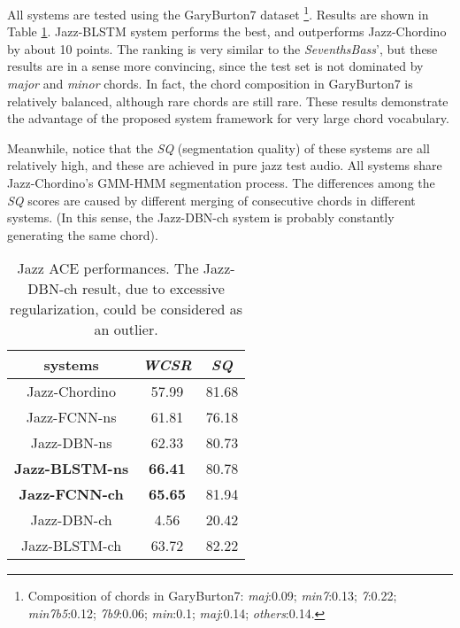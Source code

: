 All systems are tested using the GaryBurton7 dataset \footnote{Composition of chords in GaryBurton7: \textit{maj}:0.09; \textit{min7}:0.13; \textit{7}:0.22; \textit{min7b5}:0.12; \textit{7b9}:0.06; \textit{min}:0.1; \textit{maj}:0.14; \textit{others}:0.14.}. Results are shown in Table \ref{tab:5-jazz-wcsr}. Jazz-BLSTM system performs the best, and outperforms Jazz-Chordino by about 10 points. The ranking is very similar to the \textit{SeventhsBass}', but these results are in a sense more convincing, since the test set is not dominated by \textit{major} and \textit{minor} chords. In fact, the chord composition in GaryBurton7 is relatively balanced, although rare chords are still rare. These results demonstrate the advantage of the proposed system framework for very large chord vocabulary.

Meanwhile, notice that the \textit{SQ} (segmentation quality) of these systems are all relatively high, and these are achieved in pure jazz test audio. All systems share Jazz-Chordino's GMM-HMM segmentation process. The differences among the \textit{SQ} scores are caused by different merging of consecutive chords in different systems. (In this sense, the Jazz-DBN-ch system is probably constantly generating the same chord).

\begin{table}[t]
\centering
\footnotesize
\begin{tabular}{|c|c|c|} \hline
systems & \textit{WCSR} & \textit{SQ}\\ \hline
Jazz-Chordino & 57.99 & 81.68\\ \hline
Jazz-FCNN-ns & 61.81& 76.18\\ \hline
Jazz-DBN-ns & 62.33& 80.73\\ \hline
\textbf{Jazz-BLSTM-ns} & \textbf{66.41} & 80.78\\ \hline
\textbf{Jazz-FCNN-ch} & \textbf{65.65} & 81.94\\ \hline
Jazz-DBN-ch & 4.56& 20.42\\ \hline
Jazz-BLSTM-ch & 63.72 & 82.22\\ \hline
\end{tabular}
\caption{Jazz ACE performances. The Jazz-DBN-ch result, due to excessive regularization, could be considered as an outlier.}
\label{tab:5-jazz-wcsr}
\end{table}

